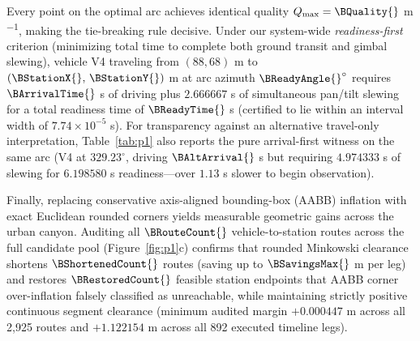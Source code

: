 Every point on the optimal arc achieves identical quality $Q_{\max}=\BQuality{}$ m\textsuperscript{$-1$}, making the tie-breaking rule decisive. Under our system-wide \emph{readiness-first} criterion (minimizing total time to complete both ground transit and gimbal slewing), vehicle V4 traveling from $(88,68)$ m to $(\BStationX{},\,\BStationY{})$ m at arc azimuth $\BReadyAngle{}^\circ$ requires $\BArrivalTime{}$ s of driving plus $2.666667$ s of simultaneous pan/tilt slewing for a total readiness time of $\BReadyTime{}$ s (certified to lie within an interval width of $7.74\times 10^{-5}$ s). For transparency against an alternative travel-only interpretation, Table~\ref{tab:p1} also reports the pure arrival-first witness on the same arc (V4 at $329.23^\circ$, driving $\BAltArrival{}$ s but requiring $4.974333$ s of slewing for $6.198580$ s readiness—over $1.13$ s slower to begin observation).

Finally, replacing conservative axis-aligned bounding-box (AABB) inflation with exact Euclidean rounded corners yields measurable geometric gains across the urban canyon. Auditing all $\BRouteCount{}$ vehicle-to-station routes across the full candidate pool (Figure~\ref{fig:p1}c) confirms that rounded Minkowski clearance shortens $\BShortenedCount{}$ routes (saving up to $\BSavingsMax{}$ m per leg) and restores $\BRestoredCount{}$ feasible station endpoints that AABB corner over-inflation falsely classified as unreachable, while maintaining strictly positive continuous segment clearance (minimum audited margin $+0.000447$ m across all 2,925 routes and $+1.122154$ m across all 892 executed timeline legs).
